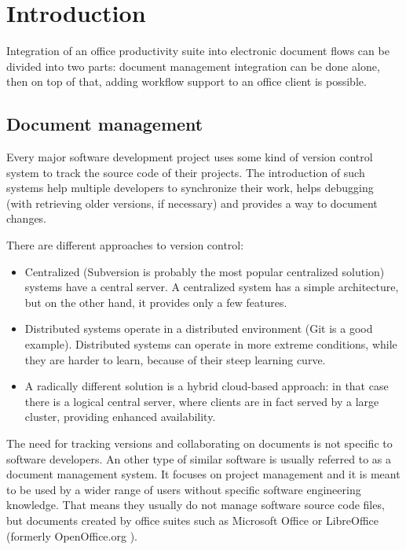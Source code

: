 \chapter{Introduction}

Integration of an office productivity suite into electronic document flows can be
divided into two parts: document management integration can be done alone, then
on top of that, adding workflow support to an office client is possible.

\section{Document management}
\label{sec:intro-docmgmt}

Every major software development project uses some kind of version control
system to track the source code of their projects. The introduction of such systems
help multiple developers to synchronize their work, helps debugging (with
retrieving older versions, if necessary) and provides a way to document changes.

There are different approaches to version control:

\begin{itemize}
\item Centralized (Subversion \cite{subversion} is probably the most popular
centralized solution) systems have a central server. A centralized system has a
simple architecture, but on the other hand, it provides only a few features.
\item Distributed systems operate in a distributed environment (Git \cite{git}
is a good example). Distributed systems can operate in more extreme conditions,
while they are harder to learn, because of their steep learning curve.
\item A radically different solution is a hybrid cloud-based approach: in that
case there is a logical central server, where clients are in fact served by a
large cluster, providing enhanced availability.
\end{itemize}

The need for tracking versions and collaborating on documents is not specific to
software developers. An other type of similar software is usually referred to as
a document management system. It focuses on project management and it is meant to be
used by a wider range of users without specific software engineering knowledge.
That means they usually do not manage software source code files, but documents
created by office suites such as Microsoft Office \cite{mso} or
LibreOffice \cite{lo} (formerly OpenOffice.org \cite{ooo}).

